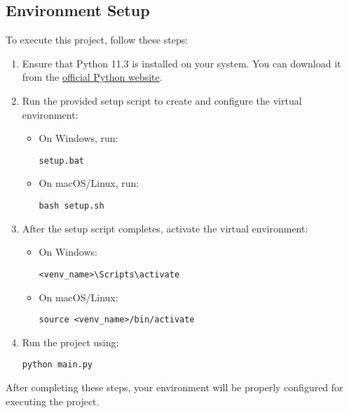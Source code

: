 	\subsection{Environment Setup}\label{sec:env-setup}
	
	To execute this project, follow these steps:
	
	\begin{enumerate}
		\item Ensure that Python 11.3 is installed on your system. You can download it from the \href{https://www.python.org/downloads/}{official Python website}.
		
		\item Run the provided setup script to create and configure the virtual environment:
		\begin{itemize}
			\item On Windows, run:
			\begin{tcolorbox}
				\texttt{setup.bat}
			\end{tcolorbox}
			\item On macOS/Linux, run:
			\begin{tcolorbox}
				\texttt{bash setup.sh}
			\end{tcolorbox}
		\end{itemize}
		
		\item After the setup script completes, activate the virtual environment:
		\begin{itemize}
			\item On Windows:
			\begin{tcolorbox}
				\texttt{<venv\_name>\textbackslash Scripts\textbackslash activate}
			\end{tcolorbox}
			\item On macOS/Linux:
			\begin{tcolorbox}
				\texttt{source <venv\_name>/bin/activate}
			\end{tcolorbox}
		\end{itemize}
		
		\item Run the project using:
		\begin{tcolorbox}
			\texttt{python main.py}
		\end{tcolorbox}
	\end{enumerate}
	
	After completing these steps, your environment will be properly configured for executing the project.
	
	
	
